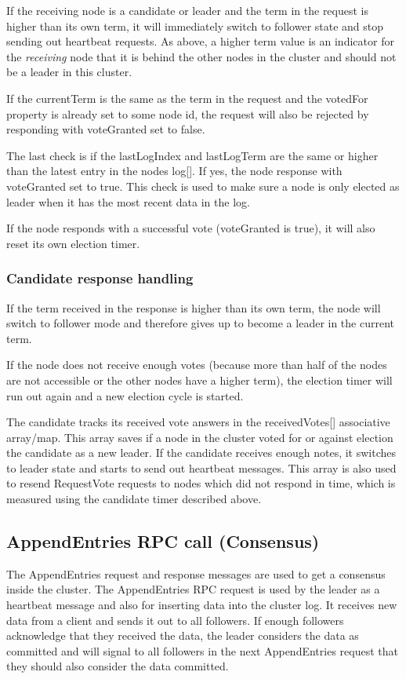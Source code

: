 If the receiving node is a candidate or leader and the term in the request is higher than its own term, it will immediately switch to follower state and stop sending out heartbeat requests.
As above, a higher term value is an indicator for the \textit{receiving} node that it is behind the other nodes in the cluster and should not be a leader in this cluster.

If the currentTerm is the same as the term in the request and the votedFor property is already set to some node id, the request will also be rejected by responding with voteGranted set to false.

The last check is if the lastLogIndex and lastLogTerm are the same or higher than the latest entry in the nodes log[]. If yes, the node response with voteGranted set to true. This check is used to make sure a node is only elected as leader when it has the most recent data in the log.

If the node responds with a successful vote (voteGranted is true), it will also reset its own election timer.

\subsubsection*{Candidate response handling}

If the term received in the response is higher than its own term, the node will switch to follower mode and therefore gives up to become a leader in the current term.

If the node does not receive enough votes (because more than half of the nodes are not accessible or the other nodes have a higher term), the election timer will run out again and a new election cycle is started.

The candidate tracks its received vote answers in the receivedVotes[] associative array/map. This array
saves if a node in the cluster voted for or against election the candidate as a new leader. If
the candidate receives enough notes, it switches to leader state and starts to send out heartbeat messages. This array is also used to resend RequestVote requests to nodes which did not respond in time,
which is measured using the candidate timer described above.

\subsection{AppendEntries RPC call (Consensus)}
The AppendEntries request and response messages are used to get a consensus inside the cluster.
The AppendEntries RPC request is used by the leader as a heartbeat message and also for
inserting data into the cluster log. It receives new data from a client and sends it out
to all followers. If enough followers acknowledge that they received the data, the leader
considers the data as committed and will signal to all followers in the next AppendEntries request 
that they should also consider the data committed.

